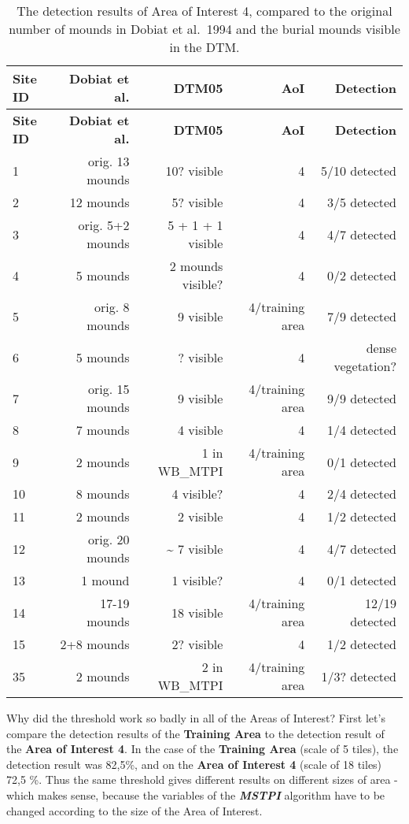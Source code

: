 \documentclass[
  12pt,
]{article}
\begin{document}
\begin{longtable}[]{@{}lrrrr@{}}
\caption{The detection results of Area of Interest 4, compared to the original number of mounds in Dobiat et al.~1994 and the burial mounds visible in the DTM.}\tabularnewline
\toprule
\textbf{Site ID} & \textbf{Dobiat et al.} & \textbf{DTM05} & \textbf{AoI} & \textbf{Detection} \\
\midrule
\endfirsthead
\toprule
\textbf{Site ID} & \textbf{Dobiat et al.} & \textbf{DTM05} & \textbf{AoI} & \textbf{Detection} \\
\midrule
\endhead
1 & orig. 13 mounds & 10? visible & 4 & 5/10 detected \\
2 & 12 mounds & 5? visible & 4 & 3/5 detected \\
3 & orig. 5+2 mounds & 5 + 1 + 1 visible & 4 & 4/7 detected \\
4 & 5 mounds & 2 mounds visible? & 4 & 0/2 detected \\
5 & orig. 8 mounds & 9 visible & 4/training area & 7/9 detected \\
6 & 5 mounds & ? visible & 4 & dense vegetation? \\
7 & orig. 15 mounds & 9 visible & 4/training area & 9/9 detected \\
8 & 7 mounds & 4 visible & 4 & 1/4 detected \\
9 & 2 mounds & 1 in WB\_MTPI & 4/training area & 0/1 detected \\
10 & 8 mounds & 4 visible? & 4 & 2/4 detected \\
11 & 2 mounds & 2 visible & 4 & 1/2 detected \\
12 & orig. 20 mounds & \textasciitilde{} 7 visible & 4 & 4/7 detected \\
13 & 1 mound & 1 visible? & 4 & 0/1 detected \\
14 & 17-19 mounds & 18 visible & 4/training area & 12/19 detected \\
15 & 2+8 mounds & 2? visible & 4 & 1/2 detected \\
35 & 2 mounds & 2 in WB\_MTPI & 4/training area & 1/3? detected \\
\bottomrule
\end{longtable}

Why did the threshold work so badly in all of the Areas of Interest? First let's compare the detection results of the \textbf{Training Area} to the detection result of the \textbf{Area of Interest 4}. In the case of the \textbf{Training Area} (scale of 5 tiles), the detection result was 82,5\%, and on the \textbf{Area of Interest 4} (scale of 18 tiles) 72,5 \%. Thus the same threshold gives different results on different sizes of area - which makes sense, because the variables of the \textbf{\emph{MSTPI}} algorithm have to be changed according to the size of the Area of Interest.
\end{document}
